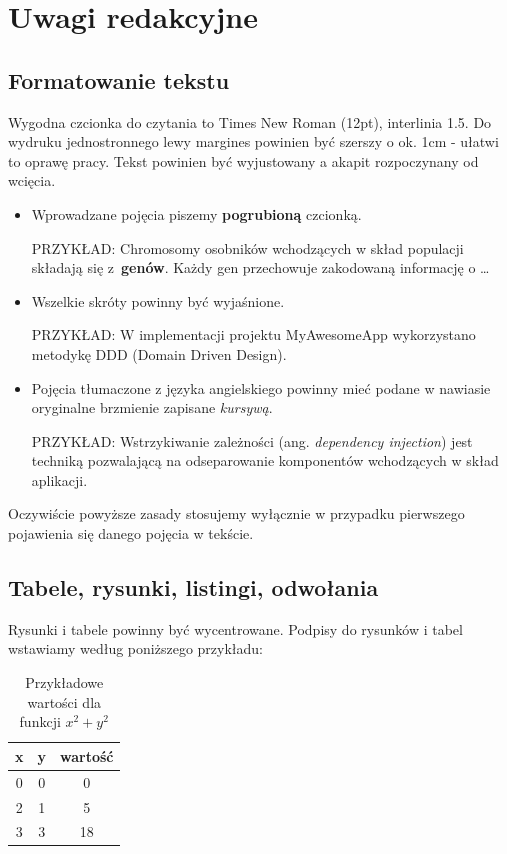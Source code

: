 \chapter{Uwagi redakcyjne}
\section{Formatowanie tekstu}
Wygodna czcionka do czytania to Times New Roman (12pt), interlinia 1.5. Do wydruku jednostronnego lewy margines powinien być szerszy o ok. 1cm - ułatwi to oprawę pracy. Tekst powinien być wyjustowany a akapit rozpoczynany od wcięcia.

\begin{itemize}
\item Wprowadzane pojęcia piszemy \textbf{pogrubioną} czcionką.

PRZYKŁAD: Chromosomy osobników wchodzących w skład populacji składają się z~\textbf{genów}. Każdy gen przechowuje zakodowaną informację o \dots

\item Wszelkie skróty powinny być wyjaśnione.

PRZYKŁAD: W implementacji projektu MyAwesomeApp wykorzystano metodykę DDD (Domain Driven Design).

\item Pojęcia tłumaczone z języka angielskiego powinny mieć podane w nawiasie oryginalne brzmienie zapisane \textit{kursywą}.

PRZYKŁAD: Wstrzykiwanie zależności (ang. \textit{dependency injection}) jest techniką pozwalającą na odseparowanie komponentów wchodzących w skład aplikacji.

\end{itemize}

Oczywiście powyższe zasady stosujemy wyłącznie w przypadku pierwszego pojawienia się danego pojęcia w tekście.

\section{Tabele, rysunki, listingi, odwołania}

Rysunki i tabele powinny być wycentrowane. Podpisy do rysunków i tabel wstawiamy według poniższego przykładu:

\begin{table}[h]
\begin{center}
\caption{Przykładowe wartości dla funkcji $x^2+y^2$}\label{table:wartosci}
\begin{tabular}{|c|c|c|}
\hline
\textbf{x} & \textbf{y} & \textbf{wartość} \\\hline
0 & 0 & 0 \\\hline
2 & 1 & 5 \\\hline
3 & 3 & 18 \\\hline
\end{tabular}
\end{center}
\end{table}

